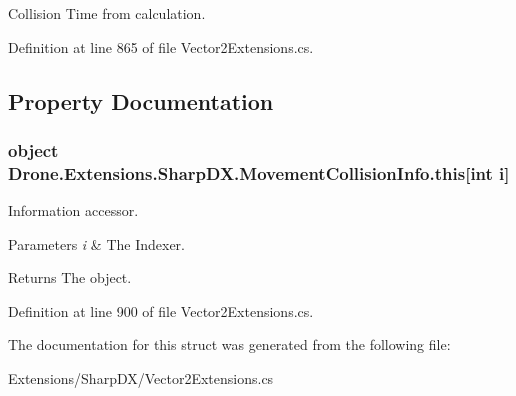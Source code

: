 Collision Time from calculation. 



Definition at line 865 of file Vector2\+Extensions.\+cs.



\subsection{Property Documentation}
\hypertarget{struct_drone_1_1_extensions_1_1_sharp_d_x_1_1_movement_collision_info_ab03a172c8d544d9b00710163c86bcf71}{}
\subsubsection[{this[int i]}]{\setlength{\rightskip}{0pt plus 5cm}object Drone.\+Extensions.\+Sharp\+D\+X.\+Movement\+Collision\+Info.\+this\mbox{[}int i\mbox{]}\hspace{0.3cm}{\ttfamily [get]}}\label{struct_drone_1_1_extensions_1_1_sharp_d_x_1_1_movement_collision_info_ab03a172c8d544d9b00710163c86bcf71}


Information accessor. 


\begin{DoxyParams}{Parameters}
{\em i} & The Indexer. \\
\hline
\end{DoxyParams}
\begin{DoxyReturn}{Returns}
The object. 
\end{DoxyReturn}


Definition at line 900 of file Vector2\+Extensions.\+cs.



The documentation for this struct was generated from the following file\+:\begin{DoxyCompactItemize}
\item 
Extensions/\+Sharp\+D\+X/Vector2\+Extensions.\+cs\end{DoxyCompactItemize}
